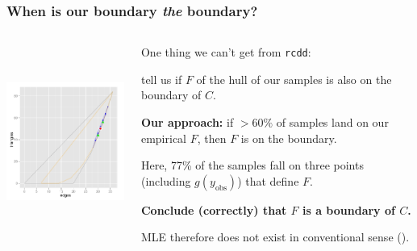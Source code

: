 \documentclass[slidestop,compress, 10pt]{beamer}
\newcommand{\yobs}{y_{\text{obs}}}
\begin{document}
\frame
{
\frametitle{When is our boundary \emph{the} boundary?}  

\begin{columns}[T]
\begin{column}[T]{0.25\textwidth}
\includegraphics[height=2.5in,trim=3.5in 2in 0.15in 0.05in,clip=true]{MCsample-77face} %
\end{column}

\begin{column}[T]{0.75\textwidth}
One thing we can't get from \texttt{rcdd}: 

tell us if $F$ of the hull 
of our samples is also on the boundary of $C$.  
\vspace{2mm}

\textbf{Our approach:} if $>60\%$ of samples land on our empirical $F$, then $F$ is on the boundary.
\vspace{4mm}

Here, 77\% of the samples fall on three points (including $g(\yobs)$) that define $F$.  
\vspace{2mm}

\textbf{Conclude (correctly) that $F$ is a boundary of $C$.}

MLE therefore does not exist in conventional sense (\checkmark).

\end{column}
\end{columns}
}
\frame
\end{document}
